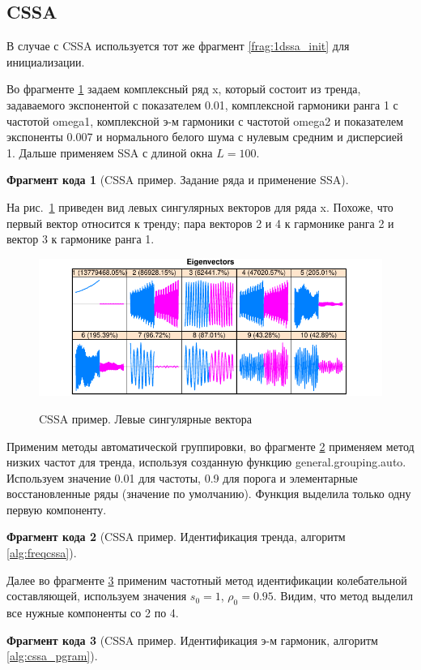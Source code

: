 \documentclass[specialist,
               substylefile = spbu.rtx,
               subf,href,colorlinks=true, 12pt]{disser}
\newtheorem{fragment}{Фрагмент кода}[section]
\newcommand{\bfgh}{\begin{figure}[!htbp]}
\newcommand{\efg}{\end{figure}}
\begin{document}
\subsection{CSSA}
В случае с CSSA используется тот же фрагмент \ref{frag:1dssa_init} для инициализации.

Во фрагменте \ref{frag:cssa_series} задаем комплексный ряд x, который состоит из тренда, задаваемого экспонентой с показателем 0.01, комплексной гармоники ранга 1 с частотой omega1, комплексной э-м гармоники с частотой omega2 и показателем экспоненты 0.007 и нормального белого шума с нулевым средним и дисперсией 1.
Дальше применяем SSA с длиной окна $L=100$.
\begin{fragment}[CSSA пример. Задание ряда и применение SSA]
\label{frag:cssa_series}

\end{fragment}
На рис.~\ref{fig:cssa_vectors} приведен вид левых сингулярных векторов для ряда x. Похоже, что первый вектор относится к тренду; пара векторов 2 и 4 к гармонике ранга 2 и вектор 3 к гармонике ранга 1.
\bfgh
        \begin{center}
{\includegraphics[width=4.5in]{cssa_vectors}}
        \end{center}
        \caption{CSSA пример. Левые сингулярные вектора}
        \label{fig:cssa_vectors}
\efg

Применим методы автоматической группировки, во фрагменте \ref{frag:cssa_trend} применяем метод низких частот для тренда, используя созданную функцию general.grouping.auto. Используем значение 0.01 для частоты, 0.9 для порога и элементарные восстановленные ряды (значение по умолчанию). Функция выделила только одну первую компоненту. 
\begin{fragment}[CSSA пример. Идентификация тренда, алгоритм \ref{alg:freqcssa}]
\label{frag:cssa_trend}

\end{fragment}
Далее во фрагменте \ref{frag:cssa_em_freq} применим частотный метод идентификации колебательной составляющей, используем значения $s_0 = 1$, $\rho_0 = 0.95$. Видим, что метод выделил все нужные компоненты со 2 по 4.
\begin{fragment}[CSSA пример. Идентификация э-м гармоник,  алгоритм \ref{alg:cssa_pgram}]
\label{frag:cssa_em_freq}

\end{fragment}
\end{document}
